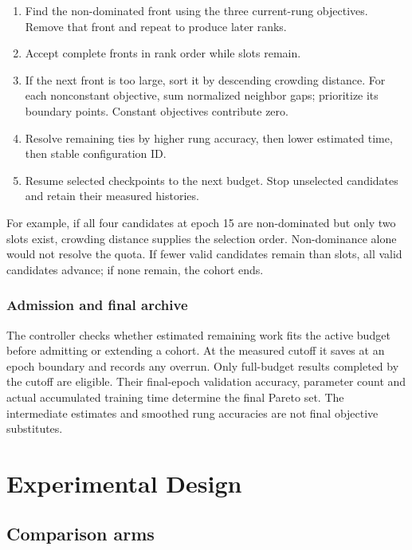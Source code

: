 \documentclass[11pt,a4paper,oneside]{report}
\begin{document}
\begin{enumerate}
\item Find the non-dominated front using the three current-rung objectives. Remove that front and repeat to produce later ranks.
\item Accept complete fronts in rank order while slots remain.
\item If the next front is too large, sort it by descending crowding distance. For each nonconstant objective, sum normalized neighbor gaps; prioritize its boundary points. Constant objectives contribute zero.
\item Resolve remaining ties by higher rung accuracy, then lower estimated time, then stable configuration ID.
\item Resume selected checkpoints to the next budget. Stop unselected candidates and retain their measured histories.
\end{enumerate}

For example, if all four candidates at epoch 15 are non-dominated but only two slots exist, crowding distance supplies the selection order. Non-dominance alone would not resolve the quota. If fewer valid candidates remain than slots, all valid candidates advance; if none remain, the cohort ends.

\subsection{Admission and final archive}

The controller checks whether estimated remaining work fits the active budget before admitting or extending a cohort. At the measured cutoff it saves at an epoch boundary and records any overrun. Only full-budget results completed by the cutoff are eligible. Their final-epoch validation accuracy, parameter count and actual accumulated training time determine the final Pareto set. The intermediate estimates and smoothed rung accuracies are not final objective substitutes.
\chapter{Experimental Design}
\section{Comparison arms}
\end{document}
